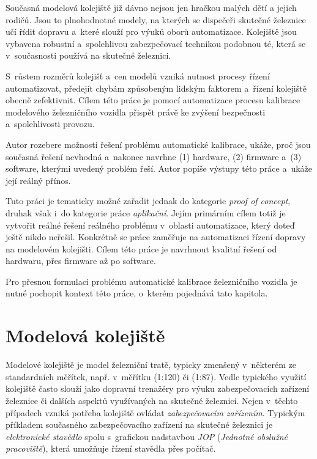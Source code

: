 Současná modelová kolejiště již dávno nejsou jen hračkou malých dětí
a jejich rodičů. Jsou to plnohodnotné modely, na kterých se dispečeři skutečné
železnice učí řídit dopravu a~které slouží pro výuků oborů automatizace.
Kolejiště jsou vybavena robustní a~spolehlivou zabezpečovací technikou
podobnou té, která se v~současnosti používá na skutečné železnici.

S~růstem rozměrů kolejišť a~cen modelů vzniká nutnost procesy řízení
automatizovat, předejít chybám způsobeným lidským faktorem a~řízení kolejiště
obecně zefektivnit. Cílem této práce je pomocí automatizace procesu kalibrace
modelového železničního vozidla přispět právě ke zvýšení bezpečnosti
a~spolehlivosti provozu.

Autor rozebere možnosti řešení problému automatické kalibrace, uká\-že, proč jsou
současná řešení nevhodná a~nakonec navrhne (1) hardware, (2) firmware a~(3)
software, kterými uvedený problém řeší. Autor popíše výstupy této práce a~ukáže
její reálný přínos.

Tuto práci je tematicky možné zařadit jednak do kategorie \textit{proof of
concept}, druhak však i~do kategorie práce \textit{aplikační}. Jejím primárním
cílem totiž je vytvořit reálné řešení reálného problému v~oblasti automatizace,
který doteď ještě nikdo neřešil. Konkrétně se práce zaměřuje na automatizaci
řízení dopravy na modelovém kolejišti. Cílem této práce je navrhnout kvalitní
řešení od hardwaru, přes firmware až po software.

Pro přesnou formulaci problému automatické kalibrace železničního vozidla je
nutné pochopit kontext této práce, o~kterém pojednává tato kapitola.

\section{Modelová kolejiště}
\label{sec:mod-kol}

Modelové kolejiště je model železniční tratě, typicky zmenšený
v~některém ze standardních měřítek, např. v~měřítku  (1:120) či 
(1:87). Vedle typického  využití kolejiště často slouží jako dopravní
trenažéry pro výuku zabezpečovacích zařízení železnice či dalších aspektů
využívaných na skutečné železnici. Nejen v~těchto případech vzniká potřeba
kolejiště ovládat \textit{zabezpečovacím zařízením}. Typickým příkladem
současného zabezpečovacího zařízení na skutečné železnici je
\textit{elektronické stavědlo} spolu s~grafickou nadstavbou
\textit{\gls{JOP}} (\textit{Jednotné obslužné pracoviště}), která umožňuje řízení
stavědla přes počítač.

